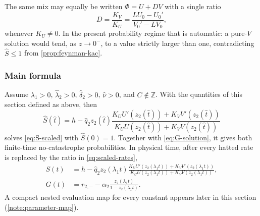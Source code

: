 The same mix may equally be written $\Phi=U+D V$ with a single ratio
\begin{equation*}
D=\frac{K_V}{K_U}
=\frac{L U_0-U_0'}{V_0'-L V_0},
\end{equation*}
whenever $K_U\neq0$. In the present probability regime that is automatic: a pure-$V$ solution would tend, as $z\to0^-$, to a value strictly larger than one, contradicting $\widehat S\leq1$ from \cref{prop:feynman-kac}.


\subsubsection{Main formula}

\begin{theorem}
\label{thm:main}
Assume $\lambda_1>0$, $\hat\lambda_2>0$, $\hat\delta_2>0$, $\hat\nu>0$, and $C\notin\mathbb Z$. With the quantities of this section defined as above, then
\begin{equation}
\boxed{
\widehat S(\hat t)=h-
\hat q_2z_2(\hat t)
\frac{K_U U'(z_2(\hat t))+K_V V'(z_2(\hat t))}
{K_U U(z_2(\hat t))+K_V V(z_2(\hat t))}}
\label{eq:S-final}
\end{equation}
solves \cref{eq:S-scaled} with $\widehat S(0)=1$. Together with \cref{eq:G-solution}, it gives both finite-time no-catastrophe probabilities. In physical time, after every hatted rate is replaced by the ratio in \cref{eq:scaled-rates},
\begin{equation}
\label{eq:unscaled-recovery}
\begin{aligned}
S(t)&=h-
\hat q_2z_2(\lambda_1t)
\frac{K_U U'(z_2(\lambda_1t))+K_V V'(z_2(\lambda_1t))}
{K_U U(z_2(\lambda_1t))+K_V V(z_2(\lambda_1t))},\\
G(t)&=r_{2,-}-\alpha_2\frac{z_2(\lambda_1t)}{1-z_2(\lambda_1t)}.
\end{aligned}
\end{equation}
A compact nested evaluation map for every constant appears later in this section (\cref{note:parameter-map}).
\end{theorem}


